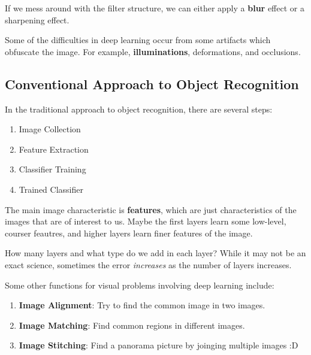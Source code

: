 \documentclass{tufte-handout}
\begin{document}
If we mess around with the filter structure, we can either apply a \textbf{blur} 
effect or a sharpening effect.

Some of the difficulties in deep learning occur from some artifacts which 
obfuscate the image. 
For example, \textbf{illuminations}, deformations, and occlusions.

\subsection{Conventional Approach to Object Recognition}
In the traditional approach to object recognition, there are several steps:
\begin{enumerate}
	\item Image Collection
	\item Feature Extraction
	\item Classifier Training
	\item Trained Classifier
\end{enumerate}

The main image characteristic is \textbf{features}, which are 
just characteristics of the images that are of interest to us.
Maybe the first layers learn some low-level, courser feautres, and 
higher layers learn finer features of the image.

How many layers and what type do we add in each layer?
While it may not be an exact science, sometimes the error \textit{increases}
as the number of layers increases.

Some other functions for visual problems involving deep learning include:
\begin{enumerate}
	\item \textbf{Image Alignment}: Try to find the common image in two images.
	\item \textbf{Image Matching}: Find common regions in different images.
	\item \textbf{Image Stitching}: Find a panorama picture by joinging multiple images :D 
\end{enumerate}
\end{document}
